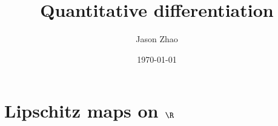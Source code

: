 \documentclass[reqno]{amsart}
\title
{
	Quantitative differentiation
}
\author{Jason Zhao}
\date{\today}
\theoremstyle{definition}
\theoremstyle{remark}
\begin{document}
\maketitle


\tableofcontents

\section{Lipschitz maps on $\R$}


\end{document}
